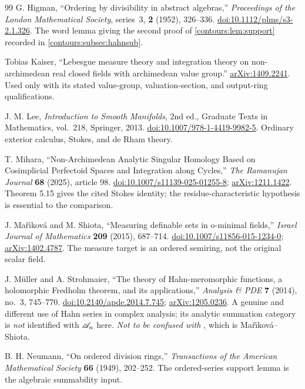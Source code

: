\documentclass[11pt,letterpaper]{article}
\theoremstyle{definition}
\theoremstyle{remark}
\numberwithin{equation}{section}
\begin{document}
\begin{thebibliography}{99}
G. Higman, ``Ordering by divisibility in abstract algebras,'' \emph{Proceedings
of the London Mathematical Society}, series~3, \textbf{2} (1952), 326--336.
\href{https://doi.org/10.1112/plms/s3-2.1.326}{doi:10.1112/plms/s3-2.1.326}.
The word lemma giving the second proof of \cref{contours:lem:support} recorded in
\cref{contours:subsec:hahnsub}.

Tobias Kaiser,
``Lebesgue measure theory and integration theory on non-archimedean real closed
fields with archimedean value group.''
\href{https://arxiv.org/abs/1409.2241}{arXiv:1409.2241}.
Used only with its stated value-group, valuation-section, and output-ring
qualifications.

J. M. Lee, \emph{Introduction to Smooth Manifolds}, 2nd ed., Graduate Texts in
Mathematics, vol.~218, Springer, 2013.
\href{https://doi.org/10.1007/978-1-4419-9982-5}{doi:10.1007/978-1-4419-9982-5}.
Ordinary exterior calculus, Stokes, and de Rham theory.

T. Mihara, ``Non-Archimedean Analytic Singular Homology Based on Cosimplicial
Perfectoid Spaces and Integration along Cycles,'' \emph{The Ramanujan Journal}
\textbf{68} (2025), article 98.
\href{https://doi.org/10.1007/s11139-025-01255-8}{doi:10.1007/s11139-025-01255-8};
\href{https://arxiv.org/abs/1211.1422}{arXiv:1211.1422}. Theorem 5.15 gives the cited
Stokes identity; the residue-characteristic hypothesis is essential to the comparison.

J. Ma\v r\'{\i}kov\'a and M. Shiota, ``Measuring definable sets in o-minimal fields,''
\emph{Israel Journal of Mathematics} \textbf{209} (2015), 687--714.
\href{https://doi.org/10.1007/s11856-015-1234-0}{doi:10.1007/s11856-015-1234-0};
\href{https://arxiv.org/abs/1402.4787}{arXiv:1402.4787}. The measure target is an
ordered semiring, not the original scalar field.

J. M\"uller and A. Strohmaier, ``The theory of Hahn-meromorphic functions, a
holomorphic Fredholm theorem, and its applications,'' \emph{Analysis \& PDE}
\textbf{7} (2014), no.~3, 745--770.
\href{https://doi.org/10.2140/apde.2014.7.745}{doi:10.2140/apde.2014.7.745};
\href{https://arxiv.org/abs/1205.0236}{arXiv:1205.0236}. A genuine and different
use of Hahn series in complex analysis; its analytic summation category is
\emph{not} identified with $\mathscr A_n$ here. \emph{Not to be confused with
\cite{MS}}, which is Ma\v r\'{\i}kov\'a--Shiota.

B. H. Neumann, ``On ordered division rings,'' \emph{Transactions of the American
Mathematical Society} \textbf{66} (1949), 202--252. The ordered-series support lemma is
the algebraic summability input.


\end{thebibliography}
\end{document}
